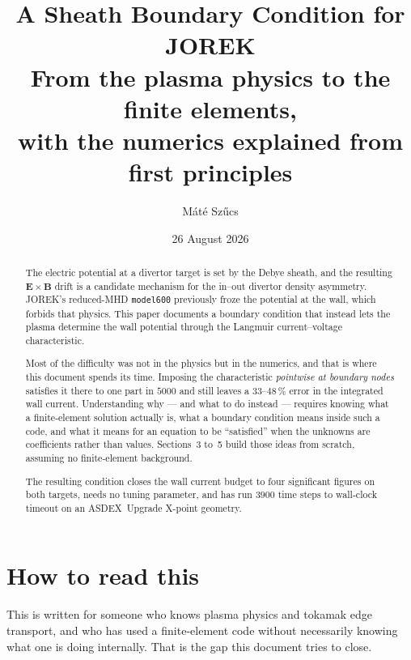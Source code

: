 \documentclass[11pt,a4paper]{article}
\title{\bf A Sheath Boundary Condition for JOREK\\[3mm]
\large From the plasma physics to the finite elements,\\
with the numerics explained from first principles}
\author{M\'at\'e Sz\H{u}cs}
\date{26 August 2026}
\newcommand{\code}[1]{\texttt{\small #1}}
\begin{document}
\maketitle

\begin{abstract}\noindent
The electric potential at a divertor target is set by the Debye sheath, and the resulting
$\bm{E}\times\bm{B}$ drift is a candidate mechanism for the in--out divertor density asymmetry.
JOREK's reduced-MHD \code{model600} previously froze the potential at the wall, which forbids that
physics. This paper documents a boundary condition that instead lets the plasma determine the wall
potential through the Langmuir current--voltage characteristic.

Most of the difficulty was not in the physics but in the numerics, and that is where this document
spends its time. Imposing the characteristic \emph{pointwise at boundary nodes} satisfies it there
to one part in $5000$ and still leaves a $33$--$48\,\%$ error in the integrated wall current.
Understanding why --- and what to do instead --- requires knowing what a finite-element solution
actually is, what a boundary condition means inside such a code, and what it means for an equation
to be ``satisfied'' when the unknowns are coefficients rather than values. Sections~3 to~5 build
those ideas from scratch, assuming no finite-element background.

The resulting condition closes the wall current budget to four significant figures on both targets,
needs no tuning parameter, and has run $3900$ time steps to wall-clock timeout on an
ASDEX~Upgrade X-point geometry.
\end{abstract}

\tableofcontents
\newpage

\section{How to read this}

This is written for someone who knows plasma physics and tokamak edge transport, and who has used a
finite-element code without necessarily knowing what one is doing internally. That is the gap this
document tries to close.
\end{document}
